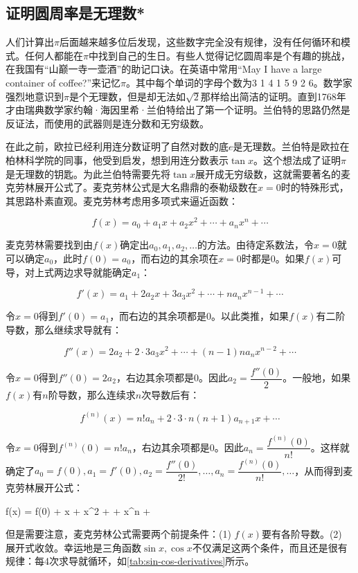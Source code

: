 \documentclass[b5paper]{ctexart}
\begin{document}
\subsection{证明圆周率是无理数*}
人们计算出$\pi$后面越来越多位后发现，这些数字完全没有规律，没有任何循环和模式。任何人都能在$\pi$中找到自己的生日。有些人觉得记忆圆周率是个有趣的挑战，在我国有“山巅一寺一壶酒”的助记口诀。在英语中常用“May I have a large container of coffee?”来记忆$\pi$。其中每个单词的字母个数为3 1 4 1 5 9 2 6。数学家强烈地意识到$\pi$是个无理数，但是却无法如$\sqrt{2}$那样给出简洁的证明。直到1768年才由瑞典数学家约翰·海因里希·兰伯特给出了第一个证明。兰伯特的思路仍然是反证法，而使用的武器则是连分数和无穷级数。

在此之前，欧拉已经利用连分数证明了自然对数的底$e$是无理数。兰伯特是欧拉在柏林科学院的同事，他受到启发，想到用连分数表示$\tan x$。这个想法成了证明$\pi$是无理数的钥匙。为此兰伯特需要先将$\tan x$展开成无穷级数，这就需要著名的麦克劳林展开公式了。麦克劳林公式是大名鼎鼎的泰勒级数在$x = 0$时的特殊形式，其思路朴素直观。麦克劳林考虑用多项式来逼近函数：

\[
f(x) = a_0 + a_1 x + a_2 x^2 + \dotsb + a_n x^n + \dotsb
\]

麦克劳林需要找到由$f(x)$确定出$a_0, a_1, a_2, \dots$的方法。由待定系数法，令$x = 0$就可以确定$a_0$，此时$f(0) = a_0$，而右边的其余项在$x = 0$时都是0。如果$f(x)$可导，对上式两边求导就能确定$a_1$：

\[
f'(x) = a_1 + 2a_2 x + 3 a_3 x^2 + \dotsb + n a_n x^{n-1} + \dotsb
\]

令$x = 0$得到$f'(0) = a_1$，而右边的其余项都是0。以此类推，如果$f(x)$有二阶导数，那么继续求导就有：

\[
f''(x) = 2a_2 + 2 \cdot 3 a_3 x^2 + \dotsb + (n-1)n a_n x^{n-2} + \dotsb
\]

令$x = 0$得到$f''(0) = 2a_2$，右边其余项都是0。因此$a_2 = \dfrac{f''(0)}{2}$。一般地，如果$f(x)$有$n$阶导数，那么连续求$n$次导数后有：

\[
f^{(n)}(x) = n!a_n + 2 \cdot 3 \cdot n (n+1) a_{n+1} x + \dotsb
\]

令$x = 0$得到$f^{(n)}(0) = n!a_n$，右边其余项都是0。因此$a_n = \dfrac{f^{(n)}(0)}{n!}$。这样就确定了$a_0 = f(0), a_1 = f'(0), a_2 = \dfrac{f''(0)}{2!}, \dotsc, a_n = \dfrac{f^{(n)}(0)}{n!}, \dotsc$，从而得到麦克劳林展开公式：

\be \label{eq:maclaurin}
f(x) = f(0) + x + x^2 + \dotsb + x^n + \dotsb
\ee

但是需要注意，麦克劳林公式需要两个前提条件：(1) $f(x)$要有各阶导数。(2) 展开式收敛。幸运地是三角函数$\sin x, \cos x$不仅满足这两个条件，而且还是很有规律：每4次求导就循环，如\cref{tab:sin-cos-derivatives}所示。
\end{document}

